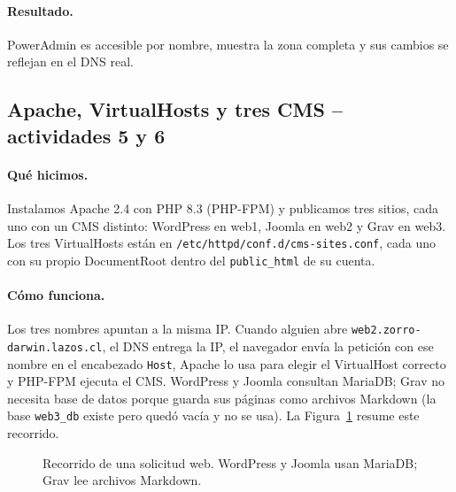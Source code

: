 \documentclass[11pt,a4paper]{article}
\newcommand{\ruta}[1]{\nolinkurl{#1}}
\begin{document}
\paragraph{Resultado.} PowerAdmin es accesible por nombre, muestra la zona completa y sus cambios se reflejan en el DNS real.

\subsection{Apache, VirtualHosts y tres CMS -- actividades 5 y 6}
\paragraph{Qué hicimos.} Instalamos Apache 2.4 con PHP 8.3 (PHP-FPM) y publicamos tres sitios, cada uno con un CMS distinto: WordPress en web1, Joomla en web2 y Grav en web3. Los tres VirtualHosts están en \ruta{/etc/httpd/conf.d/cms-sites.conf}, cada uno con su propio DocumentRoot dentro del \texttt{public\_html} de su cuenta.

\paragraph{Cómo funciona.} Los tres nombres apuntan a la misma IP. Cuando alguien abre \texttt{web2.zorro-darwin.lazos.cl}, el DNS entrega la IP, el navegador envía la petición con ese nombre en el encabezado \texttt{Host}, Apache lo usa para elegir el VirtualHost correcto y PHP-FPM ejecuta el CMS. WordPress y Joomla consultan MariaDB; Grav no necesita base de datos porque guarda sus páginas como archivos Markdown (la base \texttt{web3\_db} existe pero quedó vacía y no se usa). La Figura~\ref{fig:flujo-web} resume este recorrido.
\begin{figure}[htbp]\centering
{}
\caption[Cadena de solicitud web]{Recorrido de una solicitud web. WordPress y Joomla usan MariaDB; Grav lee archivos Markdown.}\label{fig:flujo-web}
\end{figure}
\end{document}
